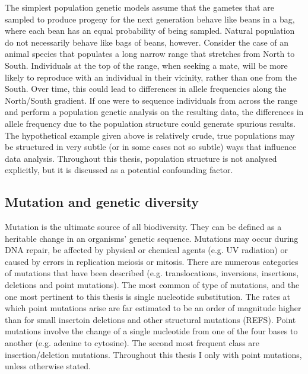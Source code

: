 	The simplest population genetic models assume that the gametes that are sampled to produce progeny for the next generation behave like beans in a bag, where each bean has an equal probability of being sampled. Natural population do not necessarily behave like bags of beans, however. Consider the case of an animal species that populates a long narrow range that stretches from North to South. Individuals at the top of the range, when seeking a mate, will be more likely to reproduce with an individual in their vicinity, rather than one from the South. Over time, this could lead to differences in allele frequencies along the North/South gradient. If one were to sequence individuals from across the range and perform a population genetic analysis on the resulting data, the differences in allele frequency due to the population structure could generate spurious results. The hypothetical example given above is relatively crude, true populations may be structured in very subtle (or in some cases not so subtle) ways that influence data analysis. Throughout this thesis, population structure is not analysed explicitly, but it is discussed as a potential confounding factor.

\subsection{Mutation and genetic diversity}

	Mutation is the ultimate source of all biodiversity. They can be defined as a heritable change in an organisms' genetic sequence. Mutations may occur during DNA repair, be affected by physical or chemical agents (e.g. UV radiation) or caused by errors in replication meiosis or mitosis. There are numerous categories of mutations that have been described (e.g. translocations, inversions, insertions, deletions and point mutations). The most common of type of mutations, and the one most pertinent to this thesis is single nucleotide substitution. The rates at which point mutations arise are far estimated to be an order of magnitude higher than for small insertoin deletions and other structural mutations (REFS). Point mutations involve the change of a single nucleotide from one of the four bases to another (e.g. adenine to cytosine). The second most frequent class are insertion/deletion mutations. Throughout this thesis I only with point mutations, unless otherwise stated.

